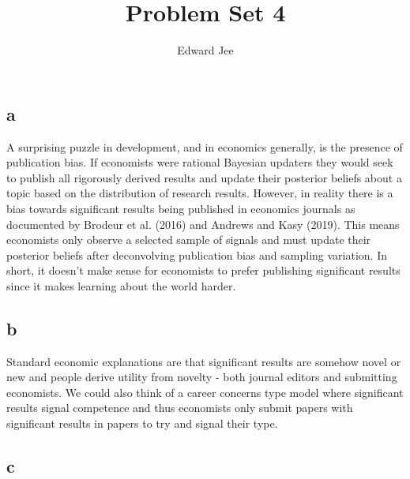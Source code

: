 \documentclass{article}
\author{Edward Jee}
\title{Problem Set 4}
\begin{document}
\maketitle


\subsection*{a}
A surprising puzzle in development, and in economics generally, is the presence 
of publication bias. If economists were rational Bayesian updaters they would 
seek to publish all rigorously derived results and update their posterior beliefs 
about a topic based on the distribution of research results. However, in reality 
there is a bias towards significant results being published in economics journals 
as documented by Brodeur et al. (2016) and Andrews and Kasy (2019). This means 
economists only observe a selected sample of signals and must update their posterior 
beliefs after deconvolving publication bias and sampling variation.
In short, it doesn't make sense for economists to prefer publishing significant results 
since it makes learning about the world harder. 


\subsection*{b}

Standard economic explanations are that significant results are somehow novel 
or new and people derive utility from novelty - both journal editors and 
submitting economists. We could also think of a 
career concerns type model where significant results signal competence and thus 
economists only submit papers with significant results in papers to try and signal 
their type.



\subsection*{c}






    
\end{document}
